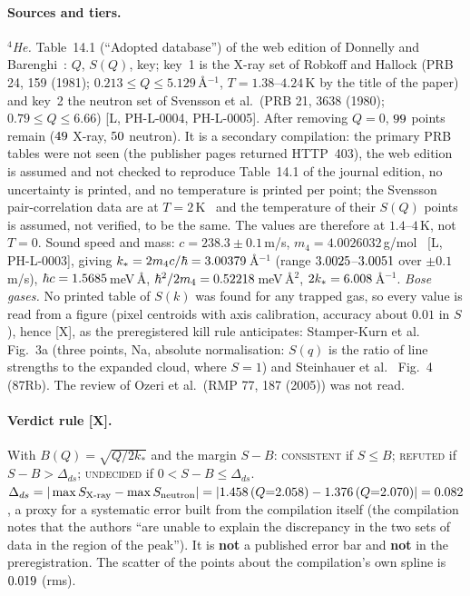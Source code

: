 \documentclass[11pt]{article}
\theoremstyle{remark}
\newcommand{\tier}[1]{\textsf{[#1]}}
\newcommand{\ks}{k_*}
\newcommand{\hb}{\hbar}
\begin{document}
\paragraph{Sources and tiers.} \emph{$^4$He.} Table~14.1 (``Adopted database'') of the web edition of Donnelly and Barenghi~\cite{db}: $Q$, $S(Q)$, key; key~1 is the X-ray set of Robkoff and Hallock (PRB 24, 159 (1981); $0.213\le Q\le5.129$\,\AA$^{-1}$,
$T=1.38$--$4.24$\,K by the title of the paper) and key~2 the neutron set of Svensson et al.~(PRB 21, 3638 (1980); $0.79\le Q\le6.66$) \tier{L, PH-L-0004, PH-L-0005}. After removing $Q=0$, $99$ points remain ($49$ X-ray, $50$ neutron).
It is a secondary compilation: the primary PRB tables were not seen (the publisher pages returned HTTP~403), the web edition is assumed and not checked to reproduce Table~14.1 of the journal edition, no uncertainty is printed, and no temperature is printed per point; the Svensson pair-correlation data are at $T=2$\,K~\cite{mg} and the temperature of their $S(Q)$ points
is assumed, not verified, to be the same. The values are therefore at $1.4$--$4$\,K, not $T=0$. Sound speed and mass: $c=238.3\pm0.1$\,m/s, $m_4=4.0026032$\,g/mol~\cite{godfrin} \tier{L, PH-L-0003}, giving $\ks=2m_4c/\hb=\PHKstar$\,\AA$^{-1}$
(range $3.0025$--$3.0051$ over $\pm0.1$\,m/s), $\hb c=\PHhbarc$\,meV\,\AA, $\hb^2/2m_4=\PHhbarTwoM$\,meV\,\AA$^2$, $2\ks=\PHTwoKstar$\,\AA$^{-1}$. \emph{Bose gases.} No printed table of $S(k)$ was found for any trapped gas,
so every value is read from a figure (pixel centroids with axis calibration, accuracy about $0.01$ in $S$), hence \tier{X}, as the preregistered kill rule anticipates: Stamper-Kurn et al.~\cite{sk} Fig.~3a (three points, Na, absolute normalisation: $S(q)$ is the ratio of line strengths to the expanded cloud, where $S=1$)
and Steinhauer et al.~\cite{st} Fig.~4 (87Rb). The review of Ozeri et al.\ (RMP 77, 187 (2005)) was not read.

\paragraph{Verdict rule \tier{X}.} With $B(Q)=\sqrt{Q/2\ks}$ and the margin $S-B$: \textsc{consistent} if $S\le B$; \textsc{refuted} if $S-B>\Delta_{ds}$; \textsc{undecided} if $0<S-B\le\Delta_{ds}$.
$\Delta_{ds}=|\max S_{\rm X\text{-}ray}-\max S_{\rm neutron}|=|1.458\,(Q{=}2.058)-1.376\,(Q{=}2.070)|=0.082$, a proxy for a systematic error built from the compilation itself (the compilation notes that the authors
``are unable to explain the discrepancy in the two sets of data in the region of the peak''). It is \textbf{not} a published error bar and \textbf{not} in the preregistration. The scatter of the points about the compilation's own spline is $0.019$ (rms).
\end{document}
